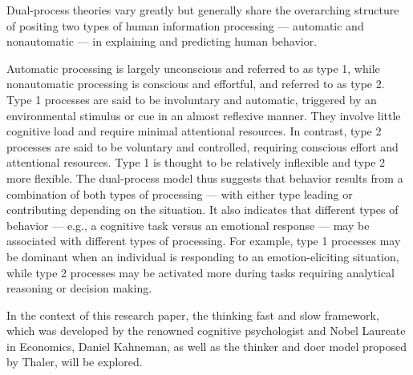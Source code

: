 
Dual-process theories vary greatly but generally share the overarching structure of positing two types of human information processing — automatic and nonautomatic — in explaining and predicting human behavior.

Automatic processing is largely unconscious and referred to as type 1, while nonautomatic processing is conscious and effortful, and referred to as type 2. Type 1 processes are said to be involuntary and automatic, triggered by an environmental stimulus or cue in an almost reflexive manner. They involve little cognitive load and require minimal attentional resources. In contrast, type 2 processes are said to be voluntary and controlled, requiring conscious effort and attentional resources. Type 1 is thought to be relatively inflexible and type 2 more flexible. The dual-process model thus suggests that behavior results from a combination of both types of processing — with either type leading or contributing depending on the situation. It also indicates that different types of behavior — e.g., a cognitive task versus an emotional response — may be associated with different types of processing. For example, type 1 processes may be dominant when an individual is responding to an emotion-eliciting situation, while type 2 processes may be activated more during tasks requiring analytical reasoning or decision making.\cite{Hansen2022Dec} 


In the context of this research paper, the thinking fast and slow framework, which was developed by the renowned cognitive psychologist and Nobel Laureate in Economics, Daniel Kahneman, as well as the thinker and doer model proposed by Thaler, will be explored.

